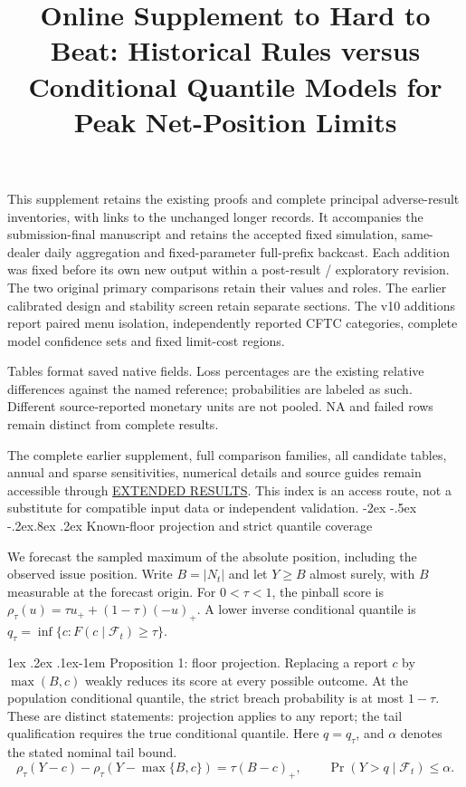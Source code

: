 \documentclass[10pt,a4paper]{article}
\title{Online Supplement to Hard to Beat: Historical Rules versus Conditional Quantile Models for Peak Net-Position Limits}
\author{}
\date{}
\makeatletter
\renewcommand\section{\@startsection{section}{1}{\z@}%
  {-2ex \@plus -.5ex \@minus -.2ex}{.8ex \@plus .2ex}%
  {\normalfont\large\bfseries}}
\renewcommand\paragraph{\@startsection{paragraph}{4}{\z@}%
  {1ex \@plus .2ex \@minus .1ex}{-1em}%
  {\normalfont\normalsize\bfseries}}
\makeatother
\begin{document}
\maketitle
This supplement retains the existing proofs and complete principal adverse-result
inventories, with links to the unchanged longer records. It accompanies the
submission-final manuscript and retains the accepted fixed simulation, same-dealer daily
aggregation and fixed-parameter full-prefix backcast. Each addition was fixed
before its own new output within a post-result / exploratory revision. The
two original primary comparisons retain their values and roles.
The earlier calibrated design and stability screen retain separate sections. The v10 additions report paired menu isolation, independently reported CFTC categories, complete model confidence sets and fixed limit-cost regions.

Tables format saved native fields. Loss percentages are the existing relative
differences against the named reference; probabilities are labeled as such.
Different source-reported monetary units are not pooled. NA and failed rows
remain distinct from complete results.

The complete earlier supplement, full comparison families, all candidate
tables, annual and sparse sensitivities, numerical details and source guides
remain accessible through \href{https://github.com/ByronLi0207/financial-mathematics-paper-20261020/blob/revision-v7-final/EXTENDED_RESULTS.md}{EXTENDED RESULTS}.
This index is an access route, not a substitute for compatible input data or
independent validation.
\begingroup
\small
\setlength{\parskip}{0pt}
\setcounter{tocdepth}{1}
\makeatletter
\renewcommand*\l@section[2]{\@dottedtocline{1}{0em}{2.5em}{#1}{#2}}
\makeatother
\tableofcontents
\endgroup
\medskip
\section{Known-floor projection and strict quantile coverage}\label{sup:floor}

We forecast the sampled maximum of the absolute position, including
the observed issue position. Write \(B=|N_t|\) and let \(Y\ge B\) almost surely,
with \(B\) measurable at the forecast origin. For \(0<\tau<1\), the pinball score is
\(\rho_\tau(u)=\tau u_+ +(1-\tau)(-u)_+\). A lower inverse conditional quantile
is \(q_\tau=\inf\{c:F(c\mid\mathcal F_t)\ge\tau\}\).

\paragraph{Proposition 1: floor projection.}
Replacing a report \(c\) by \(\max(B,c)\) weakly reduces its score at every possible
outcome. At the population conditional quantile, the strict breach probability
is at most \(1-\tau\). These are distinct statements: projection applies to any
report; the tail qualification requires the true conditional quantile.
Here \(q=q_\tau\), and \(\alpha\) denotes the stated nominal tail bound.
\[
\rho_\tau(Y-c)-\rho_\tau(Y-\max\{B,c\})=\tau(B-c)_+,\qquad \Pr(Y>q\mid\mathcal F_t)\le\alpha.
\]
\end{document}
